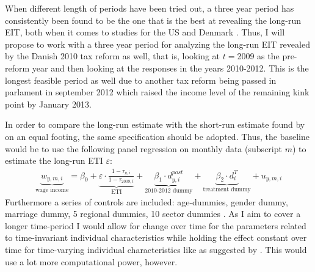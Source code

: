 When different length of periods have been tried out, a three year period has consistently been found to be the one that is the best at revealing the long-run EIT, both when it comes to studies for the US \citep{saez2012elasticity} and Denmark \citep{kleven2014estimating}. Thus, I will propose to work with a three year period for analyzing the long-run EIT revealed by the Danish 2010 tax reform as well, that is, looking at $t=$2009 as the pre-reform year and then looking at the responses in the years 2010-2012. This is the longest feasible period as well due to another tax reform being passed in parlament in september 2012 which raised the income level of the remaining kink point by January  2013.

In order to compare the long-run estimate with the short-run estimate found by \citet{kreiner2016tax} on an equal footing, the same specification should be adopted. Thus, the baseline would be to use the following panel regression on monthly data (subscript $m$) to estimate the long-run ETI $\varepsilon$:
 \begin{align}
  \underbrace{w_{y,m,i}}_\text{wage income} = \beta_0 + \underbrace{\varepsilon\cdot\frac{1-\tau_{y,i}}{1-\tau_{2009,i}}}_\text{ETI} + \underbrace{\beta_1\cdot d_{y,i}^{post}}_\text{2010-2012 dummy} + \underbrace{\beta_2\cdot d_i^T}_\text{treatment dummy} + u_{y,m,i}
  \label{eq_kreiner}
\end{align}
Furthermore a series of controls are included: age-dummies, gender dummy, marriage dummy, 5 regional dummies, 10 sector dummies \citep{kreiner2016tax}. As I aim to cover a longer time-period I would allow for change over time for the parameters related to time-invariant individual characteristics while holding the effect constant over time for time-varying individual characteristics like as suggested by \citep{kleven2014estimating}. This would use a lot more computational power, however.

